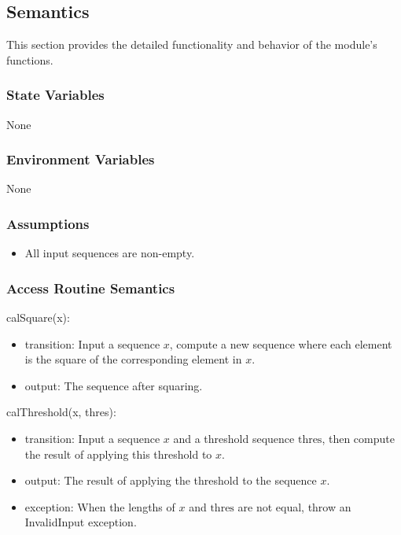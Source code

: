 \documentclass[12pt, titlepage]{article}
\begin{document}
\subsection{Semantics}

This section provides the detailed functionality and behavior of the module’s
functions.

\subsubsection{State Variables}

None

\subsubsection{Environment Variables}

None

\subsubsection{Assumptions}

\begin{itemize}
\item All input sequences are non-empty.
\end{itemize}

\subsubsection{Access Routine Semantics}

\noindent calSquare(x):
\begin{itemize}
\item transition: Input a sequence $x$, compute a new sequence where each
element is the square of the corresponding element in $x$.
\item output: The sequence after squaring.
\end{itemize}

\noindent calThreshold(x, thres):
\begin{itemize}
\item transition: Input a sequence $x$ and a threshold sequence $\text{thres}$,
then compute the result of applying this threshold to $x$.
\item output: The result of applying the threshold to the sequence $x$.
\item exception: When the lengths of $x$ and $\text{thres}$ are not equal, throw
an InvalidInput exception.
\end{itemize}
\end{document}
